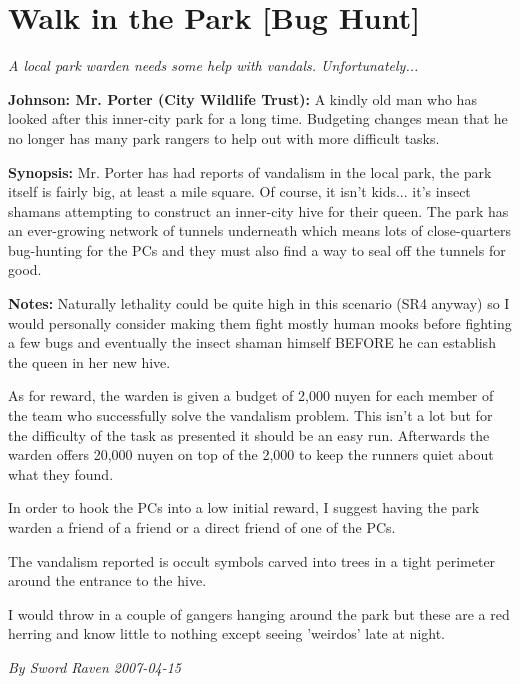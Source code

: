 \documentclass[letterpaper,twocolumn,10.5pt]{article}
\newenvironment{scenario}[6]
	{
		\section{#1 {\small[#2]}}
		\textit{#3}
		\def\TMPSCENARIO{#4 #5}
	}
	{\small\textit{By \TMPSCENARIO}}
\newcommand{\johnson}[2]{\textbf{Johnson: #1 (#2):}}
\newcommand{\synopsis}{\textbf{Synopsis: }}
\newcommand{\notes}{\textbf{Notes: }}
\begin{document}
\begin{scenario}{Walk in the Park}
	{Bug Hunt}
	{A local park warden needs some help with vandals. Unfortunately...}
	{Sword Raven}
	{2007-04-15}
	{https://forum.rpg.net/showthread.php?321504-Shadowrun-4th-101-Instant-Scenarios\&p=7172067#post7172067}

\johnson{Mr. Porter}{City Wildlife Trust} 
A kindly old man who has looked after this inner-city park for a long time. Budgeting changes mean that he no longer has many park rangers to help out with more difficult tasks.

\synopsis Mr. Porter has had reports of vandalism in the local park, the park itself is fairly big, at least a mile square. Of course, it isn't kids... it's insect shamans attempting to construct an inner-city hive for their queen. The park has an ever-growing network of tunnels underneath which means lots of close-quarters bug-hunting for the PCs and they must also find a way to seal off the tunnels for good.

\notes Naturally lethality could be quite high in this scenario (SR4 anyway) so I would personally consider making them fight mostly human mooks before fighting a few bugs and eventually the insect shaman himself BEFORE he can establish the queen in her new hive.

As for reward, the warden is given a budget of 2,000 nuyen for each member of the team who successfully solve the vandalism problem. This isn't a lot but for the difficulty of the task as presented it should be an easy run. Afterwards the warden offers 20,000 nuyen on top of the 2,000 to keep the runners quiet about what they found.

In order to hook the PCs into a low initial reward, I suggest having the park warden a friend of a friend or a direct friend of one of the PCs.

The vandalism reported is occult symbols carved into trees in a tight perimeter around the entrance to the hive.

I would throw in a couple of gangers hanging around the park but these are a red herring and know little to nothing except seeing 'weirdos' late at night. 

\end{scenario}
\end{document}

